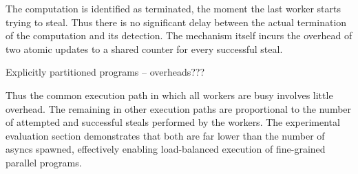The computation is identified as terminated, the moment the last
worker starts trying to steal. Thus there is no significant delay
between the actual termination of the computation and its detection.
The mechanism itself incurs the overhead of two atomic updates to a
shared counter for every successful steal. 

Explicitly partitioned programs -- overheads???

Thus the common execution path in which all workers are busy involves
little overhead. The remaining in other execution paths are
proportional to the number of attempted and successful steals
performed by the workers. The experimental evaluation section
demonstrates that both are far lower than the number of asyncs
spawned, effectively enabling load-balanced execution of fine-grained
parallel programs.

